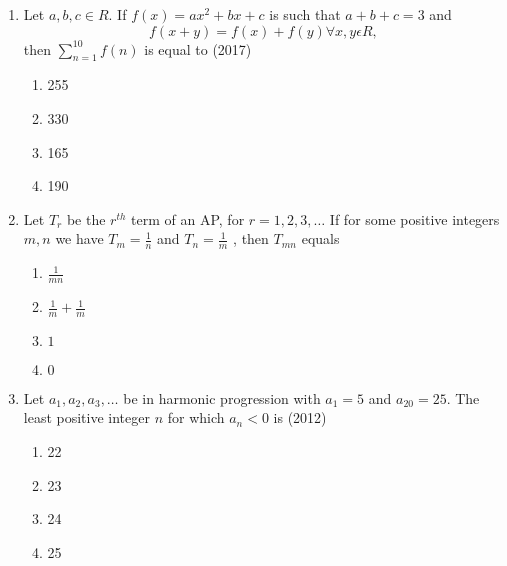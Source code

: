 \begin{enumerate}[label=\thesubsection.\arabic*,ref=\thesubsection.\theenumi]
%    
    \hfill(2006)
%
    \begin{multicols}{4}
\begin{enumerate}    
    \item$n(a_1-a_n)$
    \item$(n-1)(a_1-a_n)$
    \item$na_1a_n$
    \item$(n-1)a_1a_n$ 
    \end{enumerate}
\end{multicols}
%    
%
  \item Let $a, b, c \in R$. If $f(x)=ax^2+bx+c$ is such that $a+b+c=3$ and $$f(x+y)=f(x)+f(y) \forall x, y \epsilon R,$$  then $\sum _{n=1}^{10}  f(n)$  is  equal  to \hfill (2017)
	 \begin{multicols}{4}
\begin{enumerate}    
  \item{255}
  \item{330}
  \item{165}
  \item{190}
  \end{enumerate}
  \end{multicols}
\item Let $T_r$ be the $r^{th}$ term of an AP,  for $r=1, 2, 3, \dots$ If for some positive integers $m, n$ we have
$T_m=\frac{1}{n}$ and $T_n=\frac{1}{m}$ , then $T_{mn}$ equals \hfill{}
%
\begin{multicols}{4}
\begin{enumerate}    
\item $\frac{1}{mn}$
\item $\frac{1}{m} + \frac{1}{m}$
\item $1$
\item $0$
\end{enumerate}
\end{multicols}
\item Let ${a_1, a_2, a_3, \dots}$ be in harmonic progression with ${a_1}=5$ and ${a_{20}}=25$. The least positive integer $n$ for which ${a_n<0}$ is \hfill(2012)
                \begin{multicols}{4}
\begin{enumerate}    
                    \item 22
                    \item 23
                    \item 24
                    \item 25
                    \end{enumerate}

\end{multicols}
\end{enumerate}
